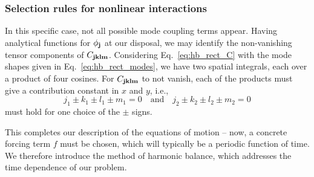 \subsubsection{Selection rules for nonlinear interactions}

In this specific case, not all possible mode coupling terms appear. Having analytical functions for $\phi_{\vb{j}}$ at our disposal, we may identify the non-vanishing tensor components of $C_{\vb{j} \vb{k} \vb{l} \vb{m}}$. Considering Eq.~\eqref{eq:hb_rect_C} with the mode shapes given in Eq.~\eqref{eq:hb_rect_modes}, we have two spatial integrals, each over a product of four cosines. For $C_{\vb{j} \vb{k} \vb{l} \vb{m}}$ to not vanish, each of the products must give a contribution constant in $x$ and $y$, i.e.,
\begin{equation}
j_1 \pm k_1 \pm l_1 \pm m_1 = 0  \quad \text{and} \quad j_2 \pm k_2 \pm l_2 \pm m_2 = 0 
\end{equation}
must hold for one choice of the $\pm$ signs.

This completes our description of the equations of motion -- now, a concrete forcing term $f$ must be chosen, which will typically be a periodic function of time. We therefore introduce the method of harmonic balance, which addresses the time dependence of our problem.


